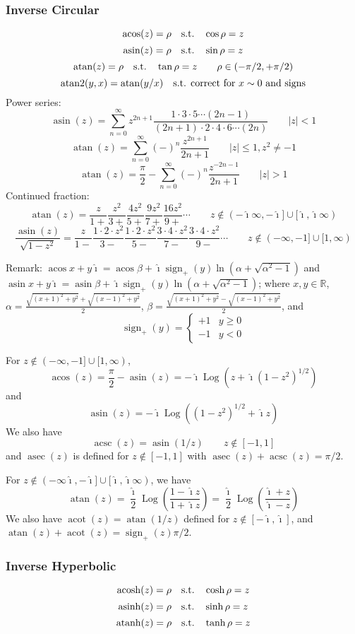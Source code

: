 \documentclass[10pt,dvipdfmx,letterpaper,twoside]{article}
\DeclareMathOperator{\acos}{acos}
\DeclareMathOperator{\asin}{asin}
\DeclareMathOperator{\atan}{atan}
\DeclareMathOperator{\acosh}{acosh}
\DeclareMathOperator{\asinh}{asinh}
\DeclareMathOperator{\atanh}{atanh}
\let\O=\operatorname
\newcommand{\RR}{{\mathbb{R}}}
\newcommand{\ii}{{\hat{\imath}}}
\let\al=\alpha
\begin{document}
\subsubsection{Inverse Circular}
\[ \acos(z) = \rho \text{\quad s.t.\quad} \cos\rho = z \]
\[ \asin(z) = \rho \text{\quad s.t.\quad} \sin\rho = z \]
\[ \atan(z) = \rho \text{\quad s.t.\quad} \tan\rho = z \qquad \rho\in(-\pi/2, +\pi/2) \]
\[ \O{atan2}(y,x) = \atan(y/x) \text{\quad s.t. correct for $x\sim0$ and signs} \]
Power series:
\[ \asin(z) = \sum_{n=0}^\infty z^{2n+1} \frac{1\cdot3\cdot5\cdots(2n-1)}{(2n+1)\cdot2\cdot4\cdot6\cdots(2n)} \qquad |z|<1 \]
\[ \atan(z) = \sum_{n=0}^\infty(-)^n\frac{z^{2n+1}}{2n+1} \qquad |z|\leq1, z^2\neq-1 \]
\[ \atan(z) = \frac{\pi}{2} - \sum_{n=0}^\infty(-)^n\frac{z^{-2n-1}}{2n+1} \qquad |z|>1 \]
Continued fraction:
\[ \atan(z) = \frac{z}{1+} \frac{z^2}{3+} \frac{4z^2}{5+} \frac{9z^2}{7+} \frac{16z^2}{9+} \cdots
  \qquad z\notin (-\ii\infty,-\ii]\cup[\ii,\ii\infty) \]
\[ \frac{\asin(z)}{\sqrt{1-z^2}} = \frac{z}{1-} \frac{1\cdot2\cdot z^2}{3-} \frac{1\cdot2\cdot z^2}{5-} \frac{3\cdot4\cdot z^2}{7-} \frac{3\cdot4\cdot z^2}{9-} \cdots
  \qquad z\notin (-\infty,-1]\cup[1,\infty) \]

Remark: $\acos x+y\ii = \acos\beta + \ii\O{sign}_+(y)\ln(\al+\sqrt{\al^2-1})$ and
$\asin x+y\ii = \asin\beta + \ii\O{sign}_+(y)\ln(\al+\sqrt{\al^2-1})$;
where $x,y\in\RR$, $\al = \frac{\sqrt{(x+1)^2+y^2} + \sqrt{(x-1)^2+y^2}}{2}$,
$\beta = \frac{\sqrt{(x+1)^2+y^2} - \sqrt{(x-1)^2+y^2}}{2}$,
and \[\O{sign}_+(y) = \begin{cases}+1&y\geq0\\-1&y<0\end{cases}\]

For $z\notin(-\infty,-1]\cup[1,\infty)$,
\[ \acos(z) = \frac{\pi}{2} - \asin(z) = -\ii \O{Log}(z + \ii(1-z^2)^{1/2}) \]
and
\[ \asin(z) = -\ii \O{Log}((1-z^2)^{1/2} + \ii z) \]
We also have
\[ \O{acsc}(z)=\asin(1/z) \qquad z\notin[-1,1] \]
and $\O{asec}(z)$ is defined for $z\notin[-1,1]$ with $\O{asec}(z)+\O{acsc}(z)=\pi/2$.

For $z\notin(-\infty\ii,-\ii]\cup[\ii,\ii\infty)$, we have
\[ \atan(z) = \frac{\ii}{2}\O{Log}(\frac{1-\ii z}{1+\ii z}) = \frac{\ii}{2}\O{Log}(\frac{\ii+z}{\ii-z}) \]
We also have $\O{acot}(z) = \atan(1/z)$ defined for $z\notin[-\ii,\ii]$, and $\atan(z)+\O{acot}(z)=\O{sign}_+(z)\pi/2$.

\subsubsection{Inverse Hyperbolic}
\[ \acosh(z) = \rho \text{\quad s.t.\quad} \cosh\rho = z \]
\[ \asinh(z) = \rho \text{\quad s.t.\quad} \sinh\rho = z \]
\[ \atanh(z) = \rho \text{\quad s.t.\quad} \tanh\rho = z \]
\end{document}
